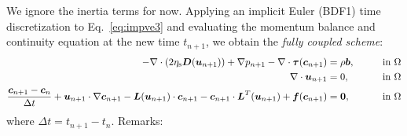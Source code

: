 We ignore the inertia terms for now. Applying an implicit Euler (BDF1) time discretization to Eq.~\eqref{eq:impve3} and evaluating the momentum balance and continuity equation at the new time $t_{n+1}$, we obtain the \emph{fully coupled scheme}:
\begin{alignat*}{2}
        -\nabla\cdot(2\eta_\text{s}\boldsymbol{D}(\boldsymbol{u}_{n+1}))+\nabla p_{n+1}-\nabla\cdot\boldsymbol{\tau}(\boldsymbol{c}_{n+1})
        &=\rho\boldsymbol{b},\qquad&&\text{in }\Omega\\
\nabla\cdot\boldsymbol{u}_{n+1}&=0,\qquad&&\text{in }\Omega\\
        \frac{\boldsymbol{c}_{n+1}-\boldsymbol{c}_n}{\Delta t}
+\boldsymbol{u}_{n+1}\cdot\nabla\boldsymbol{c}_{n+1}-\boldsymbol{L}(\boldsymbol{u}_{n+1})\cdot\boldsymbol{c}_{n+1}-\boldsymbol{c}_{n+1}\cdot\boldsymbol{L}^T(\boldsymbol{u}_{n+1})
 +\boldsymbol{f}(\boldsymbol{c}_{n+1})&=\boldsymbol{0},\qquad&&\text{in }\Omega\label{eq:dimpve3}
\end{alignat*}
where $\Delta t=t_{n+1}-t_n$.
\newpage
Remarks:
